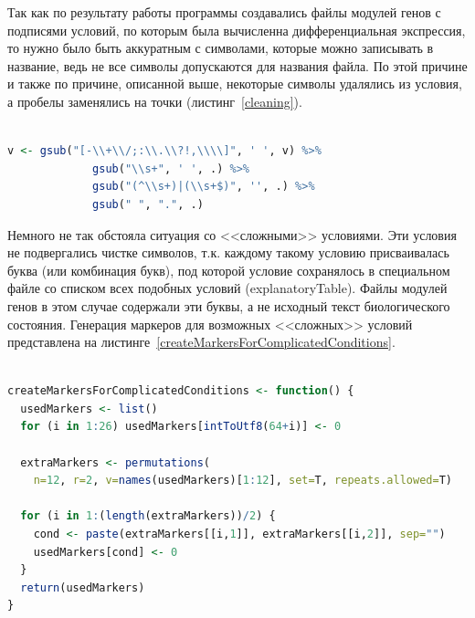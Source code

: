 \documentclass[times,specification,annotation]{itmo-student-thesis}
\begin{document}
Так как по результату работы программы создавались файлы модулей генов с подписями условий, по которым была вычисленна дифференциальная экспрессия, то нужно было быть аккуратным с символами, которые можно записывать в название, ведь не все символы допускаются для названия файла. По этой причине и также по причине, описанной выше, некоторые символы удалялись из условия, а пробелы заменялись на точки (листинг~\ref{cleaning}).  

\begin{lstlisting}[float=!h, caption={Удаление некоторых символов и замена пробелов на точки.}, captionpos=b, label={cleaning}, basicstyle=\footnotesize, language=R]

v <- gsub("[-\\+\\/;:\\.\\?!,\\\\]", ' ', v) %>% 
             gsub("\\s+", ' ', .) %>% 
             gsub("(^\\s+)|(\\s+$)", '', .) %>% 
             gsub(" ", ".", .)

\end{lstlisting} 

Немного не так обстояла ситуация со <<сложными>> условиями. Эти условия не подвергались чистке символов, т.к. каждому такому условию присваивалась буква (или комбинация букв), под которой условие сохранялось в специальном файле со списком всех подобных условий (explanatoryTable). Файлы модулей генов в этом случае содержали эти буквы, а не исходный текст биологического состояния. Генерация маркеров для возможных <<сложных>> условий представлена на листинге~\ref{createMarkersForComplicatedConditions}.  

\begin{lstlisting}[float=!h, caption={Генерация маркеров для замены <<сложных>> условий.}, captionpos=b, label={createMarkersForComplicatedConditions}, basicstyle=\footnotesize, language=R]

createMarkersForComplicatedConditions <- function() {
  usedMarkers <- list()
  for (i in 1:26) usedMarkers[intToUtf8(64+i)] <- 0
  
  extraMarkers <- permutations(
    n=12, r=2, v=names(usedMarkers)[1:12], set=T, repeats.allowed=T)
  
  for (i in 1:(length(extraMarkers))/2) {
    cond <- paste(extraMarkers[[i,1]], extraMarkers[[i,2]], sep="")
    usedMarkers[cond] <- 0
  }
  return(usedMarkers)
}

\end{lstlisting} 
\end{document}
